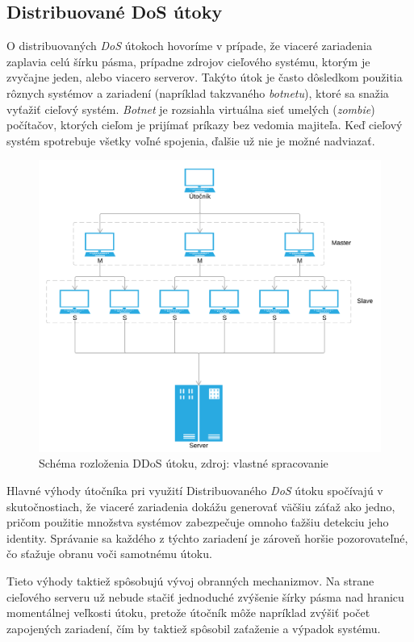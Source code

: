 \documentclass[
  digital, %
  table,   %
  lof,     %
  nolot,   %
  nocover
]{fithesis3}
\begin{document}
\subsection{Distribuované DoS útoky}
O distribuovaných \textit{DoS} útokoch hovoríme v prípade, že viaceré zariadenia zaplavia
celú šírku pásma, prípadne zdrojov cieľového systému, ktorým je zvyčajne jeden, alebo viacero
serverov. Takýto útok je často dôsledkom použitia rôznych systémov a zariadení (napríklad
takzvaného \textit{botnetu}), ktoré sa snažia vyťažiť cieľový systém. \textit{Botnet} je rozsiahla
virtuálna sieť umelých (\textit{zombie}) počítačov, ktorých cieľom je prijímať príkazy bez
vedomia majiteľa. Keď cieľový systém spotrebuje všetky voľné spojenia, ďalšie už nie
je možné nadviazať. 

\begin{figure}[h]
  \centering
    \includegraphics[width=\textwidth]{images/ddos.png}
  \caption{Schéma rozloženia DDoS útoku, zdroj: vlastné spracovanie}
  \label{fig:ddos}
\end{figure}

Hlavné výhody útočníka pri využití Distribuovaného \textit{DoS} útoku
spočívajú v skutočnostiach, že viaceré zariadenia dokážu generovať väčšiu záťaž ako jedno,
pričom použitie množstva systémov zabezpečuje omnoho ťažšiu detekciu jeho identity. Správanie
sa každého z týchto zariadení je zároveň horšie pozorovateľné, čo sťažuje obranu voči samotnému útoku.

Tieto výhody taktiež spôsobujú vývoj obranných mechanizmov. Na strane cieľového serveru už
nebude stačiť jednoduché zvýšenie šírky pásma nad hranicu momentálnej veľkosti útoku, pretože
útočník môže napríklad zvýšiť počet zapojených zariadení, čím by taktiež spôsobil zaťaženie a
výpadok systému.
\end{document}
